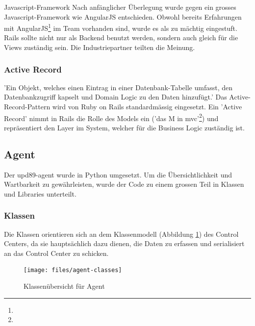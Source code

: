 \begin{decision}{Javascript-Framework}
Nach anfänglicher Überlegung wurde gegen ein grosses Javascript-Framework wie AngularJS entschieden. Obwohl bereits Erfahrungen mit AngularJS\footnote{} im Team vorhanden sind, wurde es als zu mächtig eingestuft. Rails sollte nicht nur als Backend benutzt werden, sondern auch gleich für die Views zuständig sein. Die Industriepartner teilten die Meinung. 
\end{decision}

\subsubsection*{Active Record}

'Ein Objekt, welches einen Eintrag in einer Datenbank-Tabelle umfasst, den Datenbankzugriff kapselt und Domain Logic zu den Daten hinzufügt.' \cite{poeaa}
Das Active-Record-Pattern wird von Ruby on Rails standardmässig eingesetzt. Ein 'Active Record' nimmt in Rails die Rolle des Models ein ('das M in \gls{mvc}'\footnote{}) und repräsentiert den Layer im System, welcher für die Business Logic zuständig ist.

\clearpage
\subsection*{Agent} \label{sec:architecture:agent}
Der upd89-agent wurde in Python umgesetzt. Um die Übersichtlichkeit und Wartbarkeit zu gewährleisten, wurde der Code zu einem grossen Teil in Klassen und Libraries unterteilt.

\subsubsection*{Klassen}
Die Klassen orientieren sich an dem Klassenmodell (Abbildung \ref{fig:tec:agentclasses}) des Control Centers, da sie hauptsächlich dazu dienen, die Daten zu erfassen und serialisiert an das Control Center zu schicken.

\begin{figure}[H]
	\centering
	\texttt{[image: files/agent-classes]}
	\caption{Klassenübersicht für Agent}
	\label{fig:tec:agentclasses}
\end{figure}

